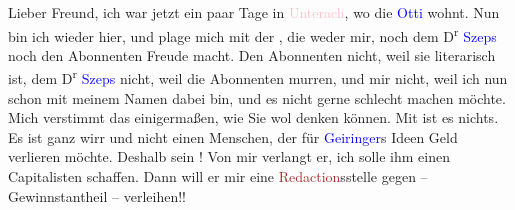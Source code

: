 \pstart
           Lieber Freund, ich war jetzt ein paar Tage in \textcolor{pink}{Unterach}{}\ledrightnote{\textcolor{pink}{Unterach am Attersee}}, wo die \textcolor{blue}{Otti}{}\ledrightnote{\textcolor{blue}{Ottilie Salten}}
               wohnt. Nun bin ich wieder hier, und plage mich mit der \label{K_L03295-1v}\label{K_L03295-1h}, die weder mir, noch dem D\textsuperscript{r}{ }\textcolor{blue}{Szeps}{}\ledrightnote{\textcolor{blue}{Moriz Szeps}} noch den Abonnenten Freude macht. Den
               Abonnenten nicht, weil sie literarisch ist, dem D\textsuperscript{r}{ }\textcolor{blue}{Szeps}{}\ledrightnote{\textcolor{blue}{Moriz Szeps}} nicht, weil die Abonnenten murren, und
               mir nicht, weil ich nun schon mit meinem Namen dabei bin, und es nicht gerne schlecht
               machen möchte. Mich verstimmt das einigermaßen, wie Sie wol denken können. Mit
                  \label{K_L03295-2v}\label{K_L03295-2h} ist es nichts. Es
               ist ganz wirr und nicht einen Menschen, der für \textcolor{blue}{Geirin{\pb}ger}{}\ledrightnote{\textcolor{blue}{Leopold Geiringer}}s Ideen Geld verlieren möchte. Deshalb sein \label{K_L03295-3v}\label{K_L03295-3h}! Von mir verlangt
               er, ich solle ihm einen Capitalisten schaffen. Dann will er mir eine \textcolor{brown}{Redaction}{}\ledrightnote{{$\rightarrow$}\textcolor{brown}{Wiener Allgemeine Montags-Zeitung}}sstelle gegen – Gewinnstantheil –
               verleihen!!\pend
           
